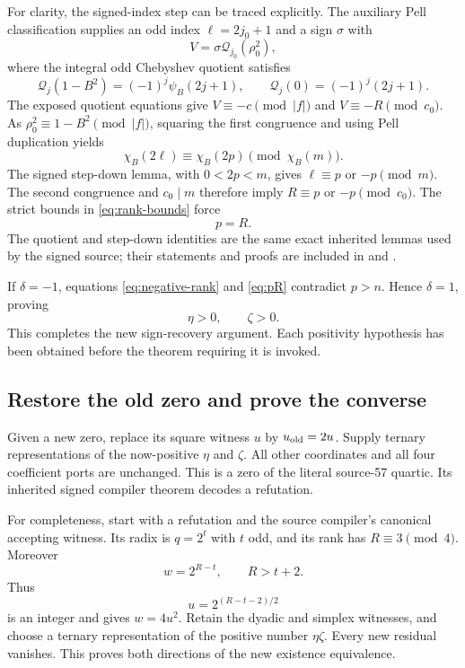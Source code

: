 \documentclass[11pt,a4paper]{article}
\theoremstyle{remark}\newtheorem{remark}[theorem]{Remark}
\begin{document}
For clarity, the signed-index step can be traced explicitly. The auxiliary
Pell classification supplies an odd index $\ell=2j_0+1$ and a sign $\sigma$
with
\[
 V=\sigma\mathcal Q_{j_0}(\rho_0^2),
\]
where the integral odd Chebyshev quotient satisfies
\[
 \mathcal Q_j(1-B^2)=(-1)^j\psi_B(2j+1),\qquad
 \mathcal Q_j(0)=(-1)^j(2j+1).
\]
The exposed quotient equations give
$V\equiv-c\pmod{|f|}$ and $V\equiv-R\pmod{c_0}$.
As $\rho_0^2\equiv1-B^2\pmod{|f|}$, squaring the first congruence and
using Pell duplication yields
\[
 \chi_B(2\ell)\equiv\chi_B(2p)\pmod{\chi_B(m)}.
\]
The signed step-down lemma, with $0<2p<m$, gives
$\ell\equiv p$ or $-p\pmod m$. The second congruence and $c_0\mid m$
therefore imply $R\equiv p$ or $-p\pmod{c_0}$.
The strict bounds in \eqref{eq:rank-bounds} force
\begin{equation}
 p=R.
 \label{eq:pR}
\end{equation}
The quotient and step-down identities are the same exact inherited lemmas
used by the signed source; their statements and proofs are included in
 and
.

If $\delta=-1$, equations \eqref{eq:negative-rank} and \eqref{eq:pR}
contradict $p>n$. Hence $\delta=1$, proving
\[
 \eta>0,\qquad\zeta>0.
\]
This completes the new sign-recovery argument. Each positivity hypothesis
has been obtained before the theorem requiring it is invoked.

\subsection{Restore the old zero and prove the converse}

Given a new zero, replace its square witness $u$ by $u_{\rm old}=2u$.
Supply ternary representations of the now-positive $\eta$ and $\zeta$.
All other coordinates and all four coefficient ports are unchanged.
This is a zero of the literal source-57 quartic. Its inherited signed
compiler theorem decodes a refutation.

For completeness, start with a refutation and the source compiler's
canonical accepting witness. Its radix is $q=2^t$ with $t$ odd, and its
rank has $R\equiv3\pmod4$. Moreover
\[
 w=2^{R-t},\qquad R>t+2.
\]
Thus
\[
 u=2^{(R-t-2)/2}
\]
is an integer and gives $w=4u^2$. Retain the dyadic and simplex witnesses,
and choose a ternary representation of the positive number $\eta\zeta$.
Every new residual vanishes. This proves both directions of the new
existence equivalence.
\end{document}

